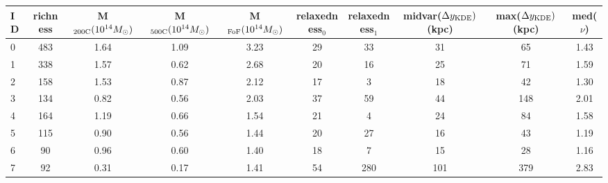 \begin{tabular}{lccccccccc}
\toprule
ID & richness & M$_{\rm 200C} (10^{14} M_\odot)$ & M$_{\rm 500C} (10^{14} M_\odot)$ & M$_{\rm FoF} (10^{14} M_\odot)$  & relaxedness$_0$ & relaxedness$_1$ & midvar($\Delta y_{\rm KDE})$ (kpc) & max($\Delta y_{\rm KDE})$ (kpc) & med($\nu$) \\
\midrule
 0 &      483 &                             1.64 &                             1.09 &                             3.23 &              29 &              33 &                                 31 &                              65 &       1.43 \\
 1 &      338 &                             1.57 &                             0.62 &                             2.68 &              20 &              16 &                                 25 &                              71 &       1.59 \\
 2 &      158 &                             1.53 &                             0.87 &                             2.12 &              17 &               3 &                                 18 &                              42 &       1.30 \\
 3 &      134 &                             0.82 &                             0.56 &                             2.03 &              37 &              59 &                                 44 &                             148 &       2.01 \\
 4 &      164 &                             1.19 &                             0.66 &                             1.54 &              21 &               4 &                                 24 &                              84 &       1.58 \\
 5 &      115 &                             0.90 &                             0.56 &                             1.44 &              20 &              27 &                                 16 &                              43 &       1.19 \\
 6 &       90 &                             0.96 &                             0.60 &                             1.40 &              18 &               7 &                                 15 &                              28 &       1.16 \\
 7 &       92 &                             0.31 &                             0.17 &                             1.41 &              54 &             280 &                                101 &                             379 &       2.83 \\

\end{tabular}
